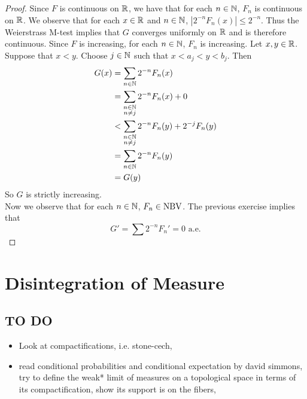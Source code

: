 \documentclass{book}
\begin{document}
	\begin{proof}
		Since $F$ is continuous on $\mathbb{R}$, we have that for each $n \in \mathbb{N}$, $F_n$ is continuous on $\mathbb{R}$. We observe that for each $x \in \mathbb{R}$ and $n \in \mathbb{N}$, $|2^{-n}F_n(x)| \leq 2^{-n}$. Thus the Weierstrass M-test implies that $G$ converges uniformly on $\mathbb{R}$ and is therefore continuous. Since $F$ is increasing, for each $n \in \mathbb{N}$, $F_n$ is increasing. Let $x, y \in \mathbb{R}$. Suppose that $x<y$. Choose $j \in \mathbb{N}$ such that $x<a_j<y<b_j$. Then 
		\begin{align*}
			G(x) 
			&= \sum_{n \in \mathbb{N}}2^{-n}F_n(x)\\
			&= \sum_{\substack{n \in \mathbb{N}\\ n \neq j}}2^{-n}F_n(x) + 0\\
			& < \sum_{\substack{n \in \mathbb{N}\\ n \neq j}}2^{-n}F_n(y) + 2^{-j}F_n(y)\\
			&=\sum_{n \in \mathbb{N}}2^{-n}F_n(y)\\
			&=G(y)
		\end{align*}
		So $G$ is strictly increasing.\\
		Now we observe that for each $n \in \mathbb{N}$, $F_n \in \text{NBV}$. The previous exercise implies that $$G' = \sum 2^{-n}F_n'=0 \text{ a.e.}$$
	\end{proof}
	
	
	
	
	
	
	
	
	
	
	
	
	
	
	
	
	
	
	
	
	
	
	
	
	
	
	
	
	
	
	
	
	
	
	\newpage
	\section{Disintegration of Measure}
	
	\subsection{TO DO}
	\begin{itemize}
		\item Look at compactifications, i.e. stone-cech, 
		\item read conditional probabilities and conditional expectation by david simmons, try to define the weak* limit of measures on a topological space in terms of its compactification, show its support is on the fibers,
	\end{itemize}
	
\end{document}
